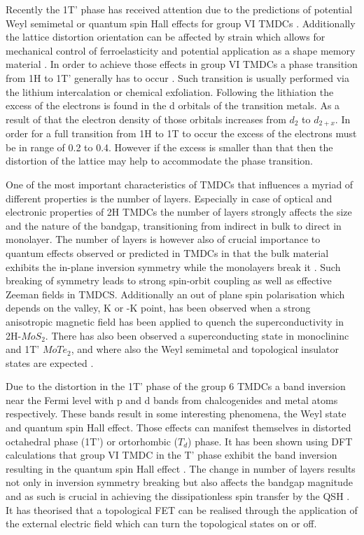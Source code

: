 Recently the 1T' phase has received attention due to the predictions of potential Weyl semimetal or quantum spin Hall effects for group VI TMDCs \cite{Qian2014}\cite{Sun2015}. Additionally the lattice distortion orientation can be affected by strain which allows for mechanical control of ferroelasticity and potential application as a shape memory material \cite{Li2016}. In order to achieve those effects in group VI TMDCs a phase transition from 1H to 1T' generally has to occur \cite{Chhowalla2013}. Such transition is usually performed via the lithium intercalation or chemical exfoliation. Following the lithiation the excess of the electrons is found in the d orbitals of the transition metals. As a result of that the electron density of those orbitals increases from $d_2$ to $d_{2+x}$. In order for a full transition from 1H to 1T to occur the excess of the electrons must be in range of 0.2 to 0.4. However if the excess is smaller than that then the distortion of the lattice may help to accommodate the phase transition.

One of the most important characteristics of TMDCs that influences a myriad of different properties is the number of layers. Especially in case of optical and electronic properties of 2H TMDCs the number of layers strongly affects the size and the nature of the bandgap, transitioning from indirect in bulk to direct in monolayer. The number of layers is however also of crucial importance to quantum effects observed or predicted in TMDCs in that the bulk material exhibits the in-plane inversion symmetry while the monolayers break it \cite{Saito2015}\cite{Lu2015}. Such breaking of symmetry leads to strong spin-orbit coupling as well as effective Zeeman fields in TMDCS. Additionally an out of plane spin polarisation which depends on the valley, K or -K point, has been observed when a strong anisotropic magnetic field has been applied to quench the superconductivity in 2H-$MoS_2$. There has also been observed a superconducting state in monoclininc and 1T' $MoTe_2$, and where also the Weyl semimetal and topological insulator states are expected \cite{Qian2014}\cite{Sun2015}\cite{Qi2016}.

Due to the distortion in the 1T' phase of the group 6 TMDCs a band inversion near the Fermi level with p and d bands from chalcogenides and metal atoms respectively. These bands result in some interesting phenomena, the Weyl state and quantum spin Hall effect. Those effects can manifest themselves in distorted octahedral phase (1T') or ortorhombic ($T_d$) phase. It has been shown using DFT calculations that group VI TMDC in the T' phase exhibit the band inversion resulting in the quantum spin Hall effect \cite{Qian2014}\cite{Choe2016}. The change in number of layers results not only in inversion symmetry breaking but also affects the bandgap magnitude and as such is crucial in achieving the dissipationless spin transfer by the QSH \cite{Kane2005}\cite{Konig2007}. It has theorised that a topological FET can be realised through the application of the external electric field which can turn the topological states on or off.

